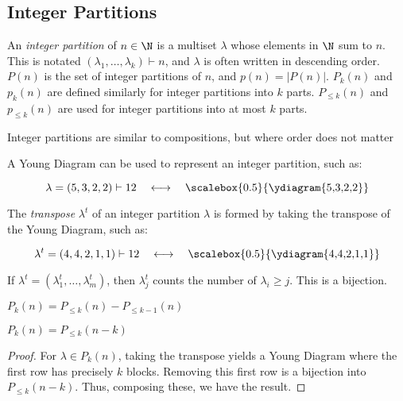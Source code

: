 \documentclass[a4paper]{article}
\begin{document}
\subsection{Integer Partitions}

\begin{definition}
An \emph{integer partition} of $n\in\N$ is a multiset $\lambda$ whose elements in $\N$ sum to $n$. This is notated $(\lambda_1,\dots,\lambda_k)\vdash n$, and $\lambda$ is often written in descending order. $P(n)$ is the set of integer partitions of $n$, and $p(n)=|P(n)|$. $P_k(n)$ and $p_k(n)$ are defined similarly for integer partitions into $k$ parts. $P_{\leq k}(n)$ and $p_{\leq k}(n)$ are used for integer partitions into at most $k$ parts.

\begin{arrows}
\item Integer partitions are similar to compositions, but where order does not matter
\end{arrows}
\end{definition}

\begin{concept}
A Young Diagram can be used to represent an integer partition, such as:

\begin{equation*}
\lambda=(5,3,2,2)\vdash 12\quad \longleftrightarrow\quad\vcenter{\hbox{\scalebox{0.5}{\ydiagram{5,3,2,2}}}}
\end{equation*}
\end{concept}

\begin{definition}
The \emph{transpose} $\lambda^t$ of an integer partition $\lambda$ is formed by taking the transpose of the Young Diagram, such as:

\begin{equation*}
\lambda^t=(4,4,2,1,1)\vdash 12\quad \longleftrightarrow\quad\vcenter{\hbox{\scalebox{0.5}{\ydiagram{4,4,2,1,1}}}}
\end{equation*}

If $\lambda^t=(\lambda^t_1,\dots,\lambda_m^t)$, then $\lambda_j^t$ counts the number of $\lambda_i\geq j$. This is a bijection.
\end{definition}

\begin{proposition}
$P_k(n)=P_{\leq k}(n)-P_{\leq k-1}(n)$
\end{proposition}

\begin{theorem}
$P_k(n)=P_{\leq k}(n-k)$

\begin{hl}
\begin{proof}
For $\lambda\in P_k(n)$, taking the transpose yields a Young Diagram where the first row has precisely $k$ blocks. Removing this first row is a bijection into $P_{\leq k}(n-k)$. Thus, composing these, we have the result.
\end{proof}
\end{hl}
\end{theorem}
\end{document}
